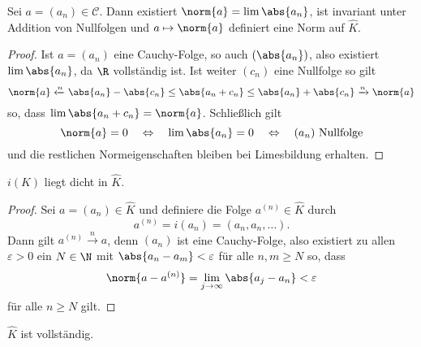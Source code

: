 
\begin{Lem}
Sei $a=(a_n)\in\mathcal{C}$. Dann existiert $\norm{a} = \lim \abs{a_n}$, ist invariant unter Addition von Nullfolgen und $a\mapsto \norm{a}$ definiert eine Norm auf $\hat{K}$.
\end{Lem}

\begin{proof}
Ist $a=(a_n)$ eine Cauchy-Folge, so auch $(\abs{a_n})$, also existiert $\lim \abs{a_n}$, da $\R$ vollständig ist.
Ist weiter $(c_n)$ eine Nullfolge so gilt
\[ \norm{a} \xleftarrow{n} \abs{a_n} - \abs{c_n} \leq \abs{a_n+c_n} \leq \abs{a_n} + \abs{c_n} \xrightarrow{n} \norm{a}
\]
so, dass $\lim \abs{a_n+c_n} = \norm{a}$. Schließlich gilt
\[ \norm{a} = 0 \quad \Leftrightarrow \quad \lim\abs{a_n} = 0 \quad \Leftrightarrow \quad
(a_n) \text{ Nullfolge}
\]
und die restlichen Normeigenschaften bleiben bei Limesbildung erhalten.
\end{proof}

\begin{Lem}
$i(K)$ liegt dicht in $\hat{K}$.
\end{Lem}

\begin{proof}
Sei $a=(a_n)\in\hat{K}$ und definiere die Folge $a^{(n)} \in \hat{K}$ durch 
\[ a^{(n)} = i(a_n) = (a_n, a_n , \dots).
\]
Dann gilt $a^{(n)} \xrightarrow{n} a$, denn $(a_n)$ ist eine Cauchy-Folge, also existiert zu allen $\varepsilon>0$ ein $N\in\N$ mit $\abs{a_n-a_m}< \varepsilon$ für alle $n,m \geq N$ so, dass
\[ \norm{a-a^{(n)}} = \lim\limits_{j \to\infty} \abs{a_j-a_n}< \varepsilon
\]
für alle $n \geq N$ gilt.
\end{proof}

\begin{Lem}
$\hat{K}$ ist vollständig.
\end{Lem}


